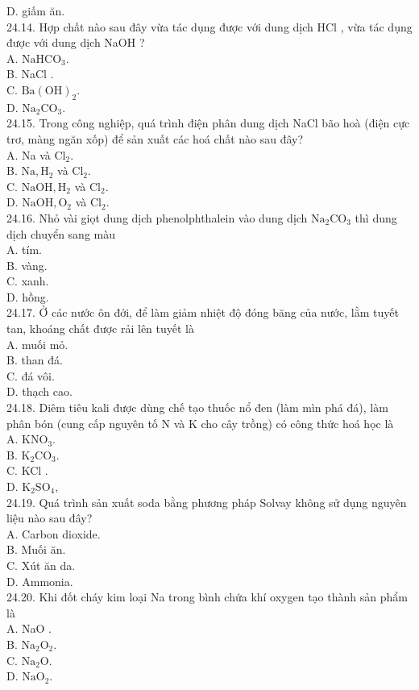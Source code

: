 \documentclass[10pt]{article}
\begin{document}
D. giấm ăn.\\
24.14. Hợp chất nào sau đây vừa tác dụng được với dung dịch HCl , vừa tác dụng được với dung dịch NaOH ?\\
A. $\mathrm{NaHCO}_{3}$.\\
B. NaCl .\\
C. $\mathrm{Ba}(\mathrm{OH})_{2}$.\\
D. $\mathrm{Na}_{2} \mathrm{CO}_{3}$.\\
24.15. Trong công nghiệp, quá trình điện phân dung dịch NaCl bão hoà (điện cực trơ, màng ngăn xốp) để sản xuất các hoá chất nào sau đây?\\
A. Na và $\mathrm{Cl}_{2}$.\\
B. $\mathrm{Na}, \mathrm{H}_{2}$ và $\mathrm{Cl}_{2}$.\\
C. $\mathrm{NaOH}, \mathrm{H}_{2}$ và $\mathrm{Cl}_{2}$.\\
D. $\mathrm{NaOH}, \mathrm{O}_{2}$ và $\mathrm{Cl}_{2}$.\\
24.16. Nhỏ vài giọt dung dịch phenolphthalein vào dung dịch $\mathrm{Na}_{2} \mathrm{CO}_{3}$ thì dung dịch chuyển sang màu\\
A. tím.\\
B. vàng.\\
C. xanh.\\
D. hồng.\\
24.17. Ở các nước ôn đới, để làm giảm nhiệt độ đóng băng của nước, lằm tuyết tan, khoáng chất được rải lên tuyết là\\
A. muối mỏ.\\
B. than đá.\\
C. đá vôi.\\
D. thạch cao.\\
24.18. Diêm tiêu kali được dùng chế tạo thuốc nổ đen (làm mìn phá đá), làm phân bón (cung cấp nguyên tố N và K cho cây trồng) có công thức hoá học là\\
A. $\mathrm{KNO}_{3}$.\\
B. $\mathrm{K}_{2} \mathrm{CO}_{3}$.\\
C. KCl .\\
D. $\mathrm{K}_{2} \mathrm{SO}_{4}$,\\
24.19. Quá trình sản xuất soda bằng phương pháp Solvay không sử dụng nguyên liệu nào sau đây?\\
A. Carbon dioxide.\\
B. Muối ăn.\\
C. Xút ăn da.\\
D. Ammonia.\\
24.20. Khi đốt cháy kim loại Na trong bình chứa khí oxygen tạo thành sản phẩm là\\
A. NaO .\\
B. $\mathrm{Na}_{2} \mathrm{O}_{2}$.\\
C. $\mathrm{Na}_{2} \mathrm{O}$.\\
D. $\mathrm{NaO}_{2}$.
\end{document}
